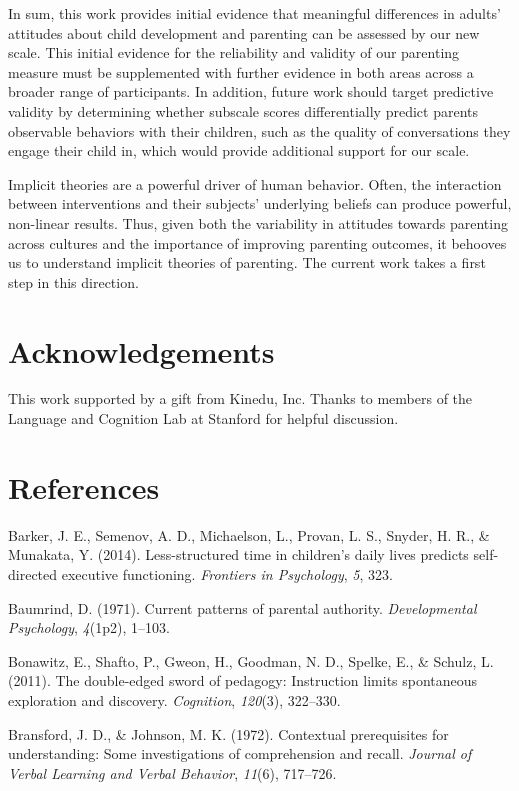 \documentclass[10pt, letterpaper]{article}
\begin{document}
In sum, this work provides initial evidence that meaningful differences
in adults' attitudes about child development and parenting can be
assessed by our new scale. This initial evidence for the reliability and
validity of our parenting measure must be supplemented with further
evidence in both areas across a broader range of participants. In
addition, future work should target predictive validity by determining
whether subscale scores differentially predict parents observable
behaviors with their children, such as the quality of conversations they
engage their child in, which would provide additional support for our
scale.

Implicit theories are a powerful driver of human behavior. Often, the
interaction between interventions and their subjects' underlying beliefs
can produce powerful, non-linear results. Thus, given both the
variability in attitudes towards parenting across cultures and the
importance of improving parenting outcomes, it behooves us to understand
implicit theories of parenting. The current work takes a first step in
this direction.

\section{Acknowledgements}\label{acknowledgements}

This work supported by a gift from Kinedu, Inc. Thanks to members of the
Language and Cognition Lab at Stanford for helpful discussion.

\section{References}\label{references}

\small

Barker, J. E., Semenov, A. D., Michaelson, L., Provan, L. S., Snyder, H.
R., \& Munakata, Y. (2014). Less-structured time in children's daily
lives predicts self-directed executive functioning. \emph{Frontiers in
Psychology}, \emph{5}, 323.

Baumrind, D. (1971). Current patterns of parental authority.
\emph{Developmental Psychology}, \emph{4}(1p2), 1--103.

Bonawitz, E., Shafto, P., Gweon, H., Goodman, N. D., Spelke, E., \&
Schulz, L. (2011). The double-edged sword of pedagogy: Instruction
limits spontaneous exploration and discovery. \emph{Cognition},
\emph{120}(3), 322--330.

Bransford, J. D., \& Johnson, M. K. (1972). Contextual prerequisites for
understanding: Some investigations of comprehension and recall.
\emph{Journal of Verbal Learning and Verbal Behavior}, \emph{11}(6),
717--726.
\end{document}
